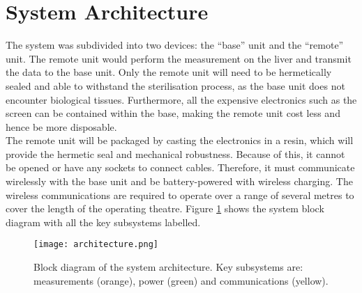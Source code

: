 \section{System Architecture}

The system was subdivided into two devices: the ``base'' unit and the ``remote'' unit. The remote unit would perform the measurement on the liver and transmit the data to the base unit. Only the remote unit will need to be hermetically sealed and able to withstand the sterilisation process, as the base unit does not encounter biological tissues. Furthermore, all the expensive electronics such as the screen can be contained within the base, making the remote unit cost less and hence be more disposable.\\

The remote unit will be packaged by casting the electronics in a resin, which will provide the hermetic seal and mechanical robustness. Because of this, it cannot be opened or have any sockets to connect cables. Therefore, it must communicate wirelessly with the base unit and be battery-powered with wireless charging. The wireless communications are required to operate over a range of several metres to cover the length of the operating theatre. Figure \ref{fig: architecture} shows the system block diagram with all the key subsystems labelled.

\begin{figure}[ht]
	\centering
	\texttt{[image: architecture.png]}
	\caption{Block diagram of the system architecture. Key subsystems are: measurements (orange), power (green) and communications (yellow).}
	\label{fig: architecture}
	\vspace{-8mm}
\end{figure}
